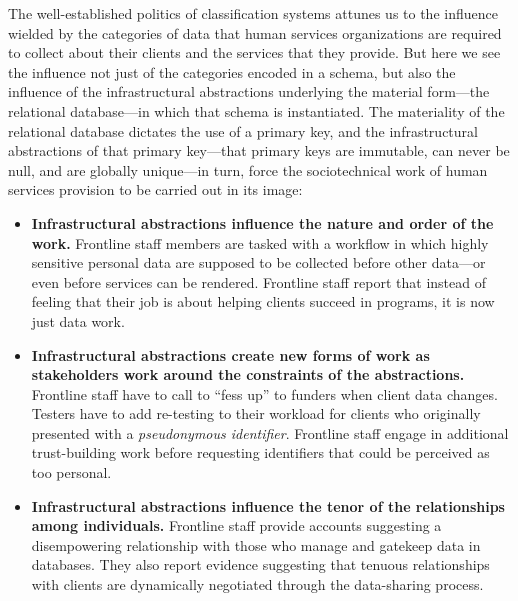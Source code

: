 The well-established politics of classification systems \citep{Bowker2000Sorting} attunes us to the influence wielded by the categories of data that human services organizations are required to collect about their clients and the services that they provide. But here we see the influence not just of the categories encoded in a schema, but also the influence of the infrastructural abstractions underlying the material form---the relational database---in which that schema is instantiated. The materiality of the relational database \citep{Dourish2017Stuff} dictates the use of a primary key, and the infrastructural abstractions of that primary key---that primary keys are immutable, can never be null, and are globally unique---in turn, force the sociotechnical work of human services provision to be carried out in its image:
\begin{itemize}
\item \textbf{Infrastructural abstractions influence the nature and order of the work.} Frontline staff members are tasked with a workflow in which highly sensitive personal data are supposed to be collected before other data---or even before services can be rendered. Frontline staff report that instead of feeling that their job is about helping clients succeed in programs, it is now just data work.
\item \textbf{Infrastructural abstractions create new forms of work as stakeholders work around the constraints of the abstractions.} Frontline staff have to call to ``fess up'' to funders when client data changes. Testers have to add re-testing to their workload for clients who originally presented with a \textit{pseudonymous identifier}. Frontline staff engage in additional trust-building work before requesting identifiers that could be perceived as too personal.
\item \textbf{Infrastructural abstractions influence the tenor of the relationships among individuals.} Frontline staff provide accounts suggesting a disempowering relationship with those who manage and gatekeep data in databases. They also report evidence suggesting that tenuous relationships with clients are dynamically negotiated through the data-sharing process.
\end{itemize}

